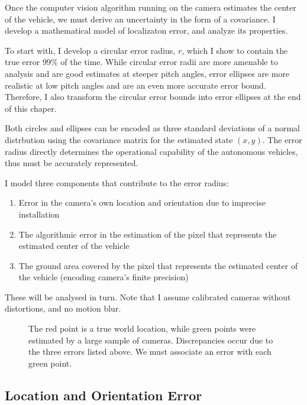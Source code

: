 \documentclass[a4paper,12pt,twoside,openright]{report}
\begin{document}
Once the computer vision algorithm running on the camera estimates the center of the vehicle,
we must derive an uncertainty in the form of a covariance. I develop a mathematical model of localizaton error,
and analyze its properties. 

To start with, I develop a circular error radius, $r$, which I show to contain
the true error 99\% of the time. While circular error radii are more amenable to analysis and are good
estimates at steeper pitch angles, error ellipses are more realistic at low pitch angles and are an 
even more accurate error bound. Therefore, I also transform the circular error bounds into error ellipses at the end of this chaper.

Both circles and ellipses can be encoded as three standard deviations of a normal distrbution
using the covariance matrix for the estimated state $(x,y)$. The error radius directly determines
the operational capability of the autonomous vehicles, thus must be accurately represented.

I model three components that contribute to the error radius:
\begin{enumerate}
    \item Error in the camera's own location and orientation due to imprecise installation
    \item The algorithmic error in the estimation of the pixel that represents the estimated center of the vehicle
    \item The ground area covered by the pixel that represents the estimated center of the vehicle (encoding camera's finite precision)
\end{enumerate}
 
These will be analysed in turn. Note that I assume calibrated cameras without distortions, and no motion blur.


\begin{figure}[htb]
    \begin{center}
        
    \end{center}
    \caption[Example Predictions about a World Point]{The red point is a true world location, while green points were
    estimated by a large sample of cameras. Discrepancies occur due to the three errors listed above. We must associate an error with each green point.}
    \label{fig:camera:dist}
\end{figure}



\subsection{Location and Orientation Error}
\end{document}
